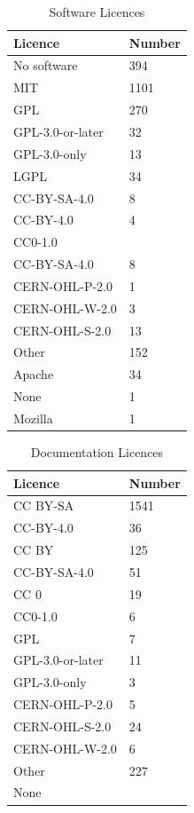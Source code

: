 \documentclass[final-report.tex]{subfiles}
\begin{document}
\begin{table}[h!]
        \centering
        \begin{tabular}{| l | l |}
        \toprule
            Licence & Number \\
        \midrule
        \midrule
            No software & 394 \\
        \midrule
            MIT & 1101 \\
        \midrule
            GPL & 270 \\
            GPL-3.0-or-later & 32 \\
            GPL-3.0-only & 13 \\
            LGPL & 34 \\
        \midrule
            CC-BY-SA-4.0 & 8 \\
            CC-BY-4.0 & 4 \\
            CC0-1.0 &  \\
            CC-BY-SA-4.0 & 8 \\
        \midrule
            CERN-OHL-P-2.0 & 1 \\
            CERN-OHL-W-2.0 & 3 \\
            CERN-OHL-S-2.0 & 13 \\
        \midrule
            Other & 152 \\
            Apache & 34 \\
            None & 1 \\
            Mozilla & 1 \\
        \bottomrule
        \end{tabular}
        \caption{Software Licences}
        \label{tab:slic}
\end{table}

\begin{table}[h!]
        \centering
        \begin{tabular}{| l | l |}
        \toprule
                Licence & Number \\
        \midrule
        \midrule
            CC BY-SA & 1541 \\
            CC-BY-4.0 & 36 \\
            CC BY & 125 \\
            CC-BY-SA-4.0 & 51 \\
            CC 0 & 19 \\
            CC0-1.0 & 6 \\
        \midrule
            GPL & 7 \\
            GPL-3.0-or-later & 11 \\
            GPL-3.0-only & 3 \\
        \midrule
            CERN-OHL-P-2.0 & 5 \\
            CERN-OHL-S-2.0 & 24 \\
            CERN-OHL-W-2.0 & 6 \\
            Other & 227 \\
            None &  \\
        \bottomrule
        \end{tabular}
        \caption{Documentation Licences}
        \label{tab:dlic}
\end{table}
\end{document}
